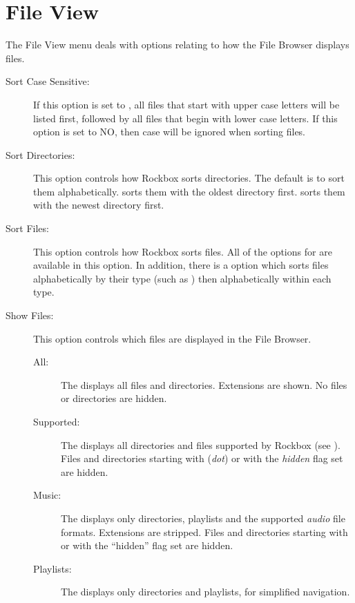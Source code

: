 \section{File View}
The File View menu deals with options relating to how the File Browser 
displays files.
%
\begin{description}
\item[Sort Case Sensitive:]
  If this option is set to , all files that start with upper case 
  letters will be listed first, followed by all files that begin with lower 
  case letters.  If this option is set to NO, then case will be ignored when 
  sorting files.
\item[Sort Directories:]
  This option controls how Rockbox sorts directories.  The default is to sort 
  them alphabetically.  sorts them with the oldest directory first. 
   sorts them with the newest directory first.
  
\item[Sort Files:]
  This option controls how Rockbox sorts files.  All of the options for 
   are available in this option.  In addition, there 
  is a  option which sorts files alphabetically by their type 
  (such as ) then alphabetically within each type.
  
\item[\label{ref:ShowFiles}Show Files:]
  This option controls which files are displayed in the File Browser.
  \begin{description}
  \item[All:] The  displays all files and directories.
    Extensions are shown. No files or directories are hidden.
  \item[Supported:] The  displays all directories and
    files supported by Rockbox (see ).
    Files and directories starting with  (\emph{dot}) or with the 
    \emph{hidden} flag set are hidden.
  \item[Music:] The  displays only directories, playlists and
    the supported \emph{audio} file formats. Extensions are stripped. Files and
    directories starting with  or with the ``hidden'' flag set are
    hidden.
  \item[Playlists:] The  displays only directories and playlists,
    for simplified navigation.
  \end{description}


\end{description}
